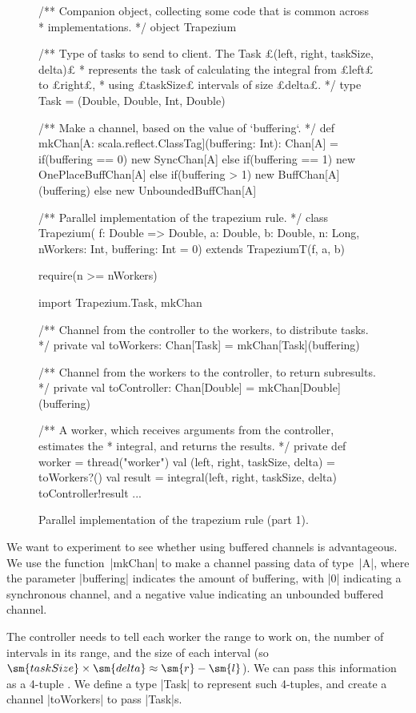 
\begin{figure}
\begin{scala}
/** Companion object, collecting some code that is common across 
  * implementations. */
object Trapezium{
  /** Type of tasks to send to client.  The Task £(left, right, taskSize, delta)£
    * represents the task of calculating the integral from £left£ to £right£,
    * using £taskSize£ intervals of size £delta£. */
  type Task = (Double, Double, Int, Double)

  /** Make a channel, based on the value of `buffering`. */
  def mkChan[A: scala.reflect.ClassTag](buffering: Int): Chan[A] = 
    if(buffering == 0) new SyncChan[A] 
    else if(buffering == 1) new OnePlaceBuffChan[A]
    else if(buffering > 1) new BuffChan[A](buffering) 
    else new UnboundedBuffChan[A]
}

/** Parallel implementation of the trapezium rule. */
class Trapezium(
  f: Double => Double, a: Double, b: Double, 
  n: Long, nWorkers: Int, buffering: Int = 0)
    extends TrapeziumT(f, a, b){
  require(n >= nWorkers)

  import Trapezium.{Task, mkChan}

  /** Channel from the controller to the workers, to distribute tasks. */
  private val toWorkers: Chan[Task] = mkChan[Task](buffering)

  /** Channel from the workers to the controller, to return subresults. */
  private val toController: Chan[Double] = mkChan[Double](buffering)

  /** A worker, which receives arguments from the controller, estimates the
    * integral, and returns the results. */
  private def worker = thread("worker"){
    val (left, right, taskSize, delta) = toWorkers?()
    val result = integral(left, right, taskSize, delta)
    toController!result
  }
  ...
}
\end{scala}
\caption{Parallel implementation of the trapezium rule (part 1).}
\label{fig:trapezium-1}
\end{figure}


We want to experiment to see whether using buffered channels is advantageous.
We use the function~|mkChan| to make a channel passing data of type~|A|, where
the parameter |buffering| indicates the amount of buffering, with |0|
indicating a synchronous channel, and a negative value indicating an unbounded
buffered channel.

The controller needs to tell each worker the range \SCALA{[l,r]} to work on,
the number  of intervals in its range, and the size
 of each interval (so $\sm{taskSize} \times \sm{delta} \approx
\sm{r} - \sm{l}$).  We can pass this information as a 4-tuple .  We define a type |Task| to represent such 4-tuples, and
create a channel |toWorkers| to pass |Task|s.  

